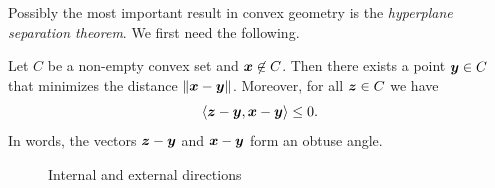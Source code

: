 Possibly the most important result in convex geometry is the {\em hyperplane separation theorem}.  We first need the following.

\begin{lemma}\label{le:obtuse}
 Let $C$ be a non-empty convex set and $\bm{x}\not\in C$. Then there exists a point $\bm{y}\in C$ that minimizes the distance $\Vert {\bm{x}-\bm{y}}\Vert$. Moreover, for all $\bm{z}\in C$ we have
 \begin{equation*}
  \langle {\bm{z}-\bm{y}}, {\bm{x}-\bm{y}} \rangle\leq 0.
 \end{equation*}
In words, the vectors $\bm{z}-\bm{y}$ and $\bm{x}-\bm{y}$ form an obtuse angle.
\end{lemma}

\begin{figure}[h!]
\centering
{}
\caption{Internal and external directions} \label{fig:neg}
\end{figure}

